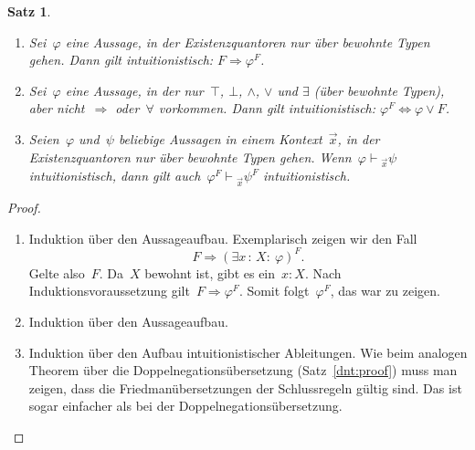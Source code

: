 \documentclass[a4paper,ngerman,12pt]{scrartcl}
\theoremstyle{definition}
\theoremstyle{plain}
\newtheorem{satz}[defn]{Satz}
\theoremstyle{remark}
\newcommand{\seq}[1]{\mathrel{\vdash\!\!\!_{#1}}}
\renewcommand{\_}{\mathpunct{.}\,}
\newcommand{\?}{\,{:}\,}
\begin{document}
\begin{satz}\label{friedman:proof}
\begin{enumerate}
\item Sei~$\varphi$ eine Aussage, in der Existenzquantoren nur über bewohnte
Typen gehen. Dann gilt intuitionistisch: $F \Longrightarrow \varphi^F$.

\item Sei~$\varphi$ eine Aussage, in der nur~$\top$, $\bot$,
$\wedge$, $\vee$ und $\exists$ (über
bewohnte Typen), aber nicht~$\Rightarrow$ oder~$\forall$ vorkommen.
Dann gilt intuitionistisch: $\varphi^F \Longleftrightarrow \varphi \vee F$.

\item Seien~$\varphi$ und~$\psi$ beliebige Aussagen in einem Kontext~$\vec x$,
in der Existenzquantoren nur über bewohnte Typen gehen.
Wenn~$\varphi \seq{\vec x} \psi$ intuitionistisch, dann gilt auch~$\varphi^F
\seq{\vec x} \psi^F$ intuitionistisch.
\end{enumerate}
\end{satz}
\begin{proof}
\begin{enumerate}
\item Induktion über den Aussageaufbau. Exemplarisch zeigen wir den Fall
\[ F \Longrightarrow (\exists x\?X{:}\ \varphi)^F. \]
Gelte also~$F$. Da~$X$ bewohnt ist, gibt es ein~$x : X$. Nach
Induktionsvoraussetzung gilt~$F \Rightarrow \varphi^F$.
Somit folgt~$\varphi^F$, das war zu zeigen.
\item Induktion über den Aussageaufbau.
\item Induktion über den Aufbau intuitionistischer Ableitungen. Wie beim
analogen Theorem über die Doppelnegationsübersetzung (Satz~\ref{dnt:proof})
muss man zeigen, dass die Friedmanübersetzungen der Schlussregeln gültig sind.
Das ist sogar einfacher als bei der Doppelnegationsübersetzung.\qedhere
\end{enumerate}
\end{proof}
\end{document}
